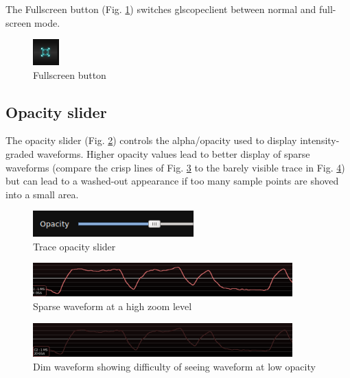 The Fullscreen button (Fig. \ref{fullscreenbutton}) switches glscopeclient between normal and full-screen mode.

\begin{figure}[h]
\centering
\includegraphics[height=1cm]{images/fullscreen-button.png}
\caption{Fullscreen button}
\label{fullscreenbutton}
\end{figure}

\subsection{Opacity slider}

The opacity slider (Fig. \ref{opacityslider}) controls the alpha/opacity used to display intensity-graded waveforms.
Higher opacity values lead to better display of sparse waveforms (compare the crisp lines of Fig. \ref{sparse-waveform}
to the barely visible trace in Fig. \ref{dim-waveform}) but can lead to a washed-out appearance if too many sample
points are shoved into a small area.

\begin{figure}[H]
\centering
\includegraphics[height=1cm]{images/opacity-slider.png}
\caption{Trace opacity slider}
\label{opacityslider}
\end{figure}

\begin{figure}[H]
\centering
\includegraphics[width=10cm]{images/sparse-waveform.png}
\caption{Sparse waveform at a high zoom level}
\label{sparse-waveform}
\end{figure}

\begin{figure}[H]
\centering
\includegraphics[width=10cm]{images/dim-waveform.png}
\caption{Dim waveform showing difficulty of seeing waveform at low opacity}
\label{dim-waveform}
\end{figure}

